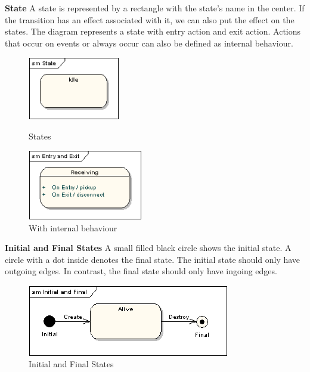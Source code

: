 \textbf{State} A state is represented by a rectangle with the state's name in the center. 
If the transition has an effect associated with it, we can also put the effect on the states. 
The diagram represents a state with entry action and exit action.
Actions that occur on events or always occur can also be defined as internal behaviour\cite{state_machine_diagram}.


\begin{figure}[htbp]
\begin{minipage}[t]{0.4\textwidth}
\centering
\includegraphics[width=4cm]{Bilder/sm1.png}
\caption{States\cite{state_machine_diagram}}
\end{minipage}
\begin{minipage}[t]{0.4\textwidth}
\centering
\includegraphics[width=5cm]{Bilder/sm2.png}
\caption{With internal behaviour\cite{state_machine_diagram}}
\end{minipage}
\end{figure}

\textbf{Initial and Final States}
A small filled black circle shows the initial state. 
A circle with a dot inside denotes the final state. 
The initial state should only have outgoing edges.
In contrast, the final state should only have ingoing edges.
\begin{figure}[ht]
    \centering
    \includegraphics[scale=0.55]{Bilder/sm3.png}
    \caption{Initial and Final States\cite{state_machine_diagram}}
    \label{fig:picture4}
\end{figure}

